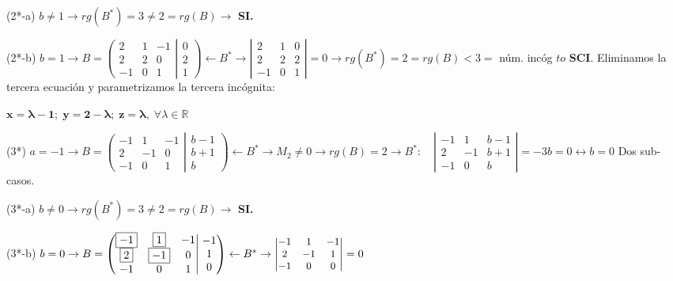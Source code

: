 \begin{proofw}
(2*-a) $b\neq 1 \to rg(B^*)=3\neq 2=rg(B) \rightarrow $ \textbf{ SI.}


(2*-b) $b=1 \to  B=\left( \begin{matrix} \boxed{2}&\boxed{1}&-1\\\boxed{2}&\boxed{2}&0\\-1&0&1 \end{matrix} \right| \left. \begin{matrix} 0\\2\\1 \end{matrix} \right)
\leftarrow B^* \to \left| \begin{matrix} 2&1&0\\2&2&2\\-1&0&1 \end{matrix} \right| =0 \to rg(B^*)=2=rg(B)<3=$ núm. incóg $to$ \textbf{SCI}. Eliminamos la tercera ecuación y parametrizamos la tercera incógnita: 

$\boldsymbol{x=\lambda-1; \; y=2-\lambda; \; z=\lambda}, \; \forall \lambda \in \mathbb R$



\noindent(3*)  $a=-1 \longrightarrow  B=\left( \begin{matrix} \boxed{-1}&\boxed{1}&-1\\\boxed{2}&\boxed{-1}&0\\-1&0&1 \end{matrix} \right| \left. \begin{matrix} b-1\\b+1\\b \end{matrix} \right)
\leftarrow B^* \to \boxed{M_2}\neq 0 \to rg(B)=2 \longrightarrow B^*:\quad 
\left| \begin{matrix} -1&1&b-1\\2&-1&b+1\\-1&0&b \end{matrix} \right|= -3b=0 \leftrightarrow b=0$ Dos sub-casos.


(3*-a) $b\neq 0 \to rg(B^*)=3\neq 2=rg(B) \rightarrow $ \textbf{ SI.}

(3*-b) $b=0 \to  B=\left( \begin{matrix} \boxed{-1}&\boxed{1}&-1\\\boxed{2}&\boxed{-1}&0\\-1&0&1 \end{matrix} \right| \left. \begin{matrix} -1\\1\\0\end{matrix} \right)
\leftarrow B^* \to \small{\left| \begin{matrix} -1&1&-1\\2&-1&1\\-1&0&0 \end{matrix} \right| =0}$ 


\end{proofw}
